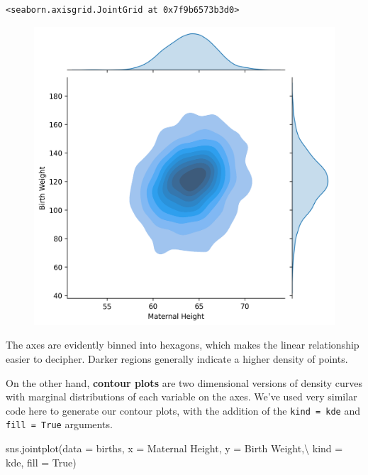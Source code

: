 \documentclass[
  letterpaper,
  DIV=11,
  numbers=noendperiod]{scrreprt}
\newenvironment{Shaded}{\begin{snugshade}}{\end{snugshade}}
\newcommand{\NormalTok}[1]{\textcolor[rgb]{0.00,0.23,0.31}{#1}}
\newcommand{\OperatorTok}[1]{\textcolor[rgb]{0.37,0.37,0.37}{#1}}
\newcommand{\StringTok}[1]{\textcolor[rgb]{0.13,0.47,0.30}{#1}}
\newcommand{\VariableTok}[1]{\textcolor[rgb]{0.07,0.07,0.07}{#1}}
\begin{document}
\begin{verbatim}
<seaborn.axisgrid.JointGrid at 0x7f9b6573b3d0>
\end{verbatim}

\begin{figure}[H]

{\centering \includegraphics{visualization_2/visualization_2_files/figure-pdf/cell-11-output-2.png}

}

\end{figure}

The axes are evidently binned into hexagons, which makes the linear
relationship easier to decipher. Darker regions generally indicate a
higher density of points.

On the other hand, \textbf{contour plots} are two dimensional versions
of density curves with marginal distributions of each variable on the
axes. We've used very similar code here to generate our contour plots,
with the addition of the
\texttt{kind\ =\ \textquotesingle{}kde\textquotesingle{}} and
\texttt{fill\ =\ True} arguments.

\begin{Shaded}
\begin{Highlighting}[]
\NormalTok{sns.jointplot(data }\OperatorTok{=}\NormalTok{ births, x }\OperatorTok{=} \StringTok{\textquotesingle{}Maternal Height\textquotesingle{}}\NormalTok{, y }\OperatorTok{=} \StringTok{\textquotesingle{}Birth Weight\textquotesingle{}}\NormalTok{,}\OperatorTok{\textbackslash{}}
\NormalTok{              kind }\OperatorTok{=} \StringTok{\textquotesingle{}kde\textquotesingle{}}\NormalTok{, fill }\OperatorTok{=} \VariableTok{True}\NormalTok{)}
\end{Highlighting}
\end{Shaded}
\end{document}
